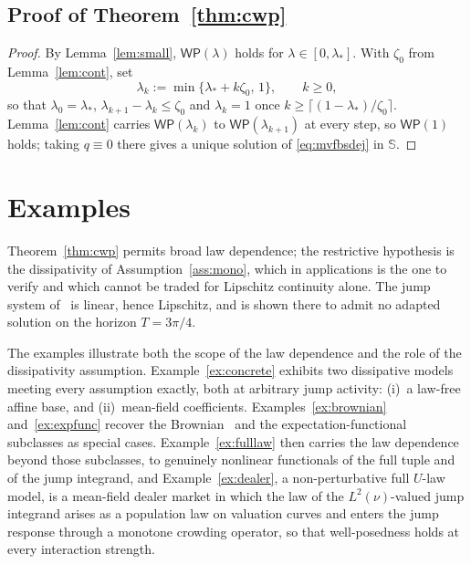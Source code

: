 \documentclass[preprint,12pt]{elsarticle}
\newcommand{\Lnu}{L^2(\nu)}
\newcommand{\HH}{\mathbb{S}}
\numberwithin{equation}{section}
\theoremstyle{plain}
\theoremstyle{definition}
\theoremstyle{\PaperRemarkStyle}
\begin{document}
\subsection{Proof of Theorem~\texorpdfstring{\ref{thm:cwp}}{3.5}}\label{sub:proofcwp}

\begin{proof}
By Lemma~\ref{lem:small}, $\mathsf{WP}(\lambda)$ holds for $\lambda\in[0,\lambda_*]$. With
$\zeta_0$ from Lemma~\ref{lem:cont}, set
\[
\lambda_k:=\min\{\lambda_*+k\zeta_0,\,1\},\qquad k\ge0 ,
\]
so that $\lambda_0=\lambda_*$, $\lambda_{k+1}-\lambda_k\le\zeta_0$ and $\lambda_k=1$ once
$k\ge\lceil(1-\lambda_*)/\zeta_0\rceil$. Lemma~\ref{lem:cont} carries
$\mathsf{WP}(\lambda_k)$ to $\mathsf{WP}(\lambda_{k+1})$ at every step, so
$\mathsf{WP}(1)$ holds; taking $q\equiv0$ there gives a unique solution of
\eqref{eq:mvfbsdej} in $\HH$.
\end{proof}

 \section{Examples}\label{sec:examples}

Theorem~\ref{thm:cwp} permits broad law dependence; the restrictive hypothesis is the
dissipativity of Assumption~\ref{ass:mono}, which in applications is the one to verify
and which cannot be traded for Lipschitz continuity alone. The jump system
of~\cite[Example~3.2]{LiMin} is linear, hence Lipschitz, and is shown there to admit no
adapted solution on the horizon $T=3\pi/4$.

The examples illustrate both the scope of the law dependence and the role of the
dissipativity assumption. Example~\ref{ex:concrete} exhibits two dissipative models
meeting every assumption exactly, both at arbitrary jump activity: (i)~a law-free affine base,
and (ii)~mean-field coefficients.
Examples~\ref{ex:brownian} and~\ref{ex:expfunc} recover the Brownian~\cite{BYZ} and the
expectation-functional~\cite{LiMin} subclasses as special cases.
Example~\ref{ex:fulllaw} then carries the law dependence beyond those subclasses, to genuinely
nonlinear functionals of the full tuple and of the jump integrand, and
Example~\ref{ex:dealer}, a non-perturbative full $U$-law model, is a
mean-field dealer market in which the law of the $\Lnu$-valued jump integrand arises as a
population law on valuation curves and enters the jump response through a monotone
crowding operator, so that well-posedness holds at every interaction strength.
\end{document}
